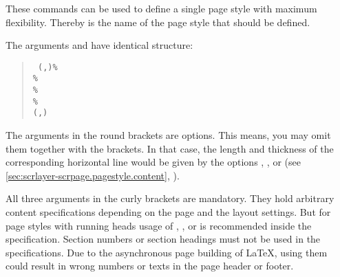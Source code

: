 \begin{Declaration}
\end{Declaration}
These commands can be used to define a single page style with maximum
flexibility. Thereby  is the name of the page style that should
be defined.

The arguments  and  have
identical structure:
\begin{quote}\raggedright
  \texttt{%
    (,)\%\\
    \%\\
    \%\\
    \%\\
    (,)%
  }
\end{quote}
The arguments in the round brackets are options. This means, you may omit them
together with the brackets. In that case, the length and thickness of the
corresponding horizontal line would be given by the \KOMAScript{} options
,
,
 or
 (see
\autoref{sec:scrlayer-scrpage.pagestyle.content},
).

All three arguments in the curly brackets are mandatory. They hold arbitrary
content specifications depending on the page and the layout settings. But for
page styles with running heads usage of
,
, or
 is recommended inside the
specification. Section numbers or section headings must not be used in the
specifications. Due to the asynchronous page building of \LaTeX, using them
could result in wrong numbers or texts in the page header or footer.

